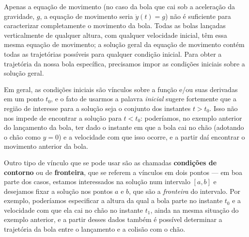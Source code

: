 \documentclass[12pt,a4paper,oneside]{memoir}
\begin{document}
Apenas a equação de movimento (no caso da bola que cai sob a aceleração da gravidade, $g$, a equação de movimento seria $\ddot{y}(t) = g$) não é suficiente para caracterizar completamente o movimento da bola.  Todas as bolas lançadas verticalmente de qualquer altura, com qualquer velocidade inicial, têm essa mesma equação de movimento; a solução geral da equação de movimento contém todas as trajetórias possíveis para qualquer condição inicial.  Para obter a trajetória da nossa bola específica, precisamos impor as condições iniciais sobre a solução geral.

Em geral, as condições iniciais são vínculos sobre a função e/ou suas derivadas em um ponto $t_0$, e o fato de usarmos a palavra \emph{inicial} sugere fortemente que a região de interesse para a solução seja o conjunto dos instantes $t > t_0$.  Isso não nos impede de encontrar a solução para $t < t_0$: poderíamos, no exemplo anterior do lançamento da bola, ter dado o instante em que a bola cai no chão (adotando o chão como $y = 0$) e a velocidade com que isso ocorre, e a partir daí encontrar o movimento anterior da bola.

Outro tipo de vínculo que se pode usar são as chamadas \textbf{condições de contorno} ou de \textbf{fronteira}, que se referem a vínculos em dois pontos --- em boa parte dos casos, estamos interessados na solução num intervalo $[a, b]$ e desejamos fixar a solução nos pontos $a$ e $b$, que são a \emph{fronteira} do intervalo.  Por exemplo, poderíamos especificar a altura da qual a bola parte no instante $t_0$ e a velocidade com que ela cai no chão no instante $t_1$, ainda na mesma situação do exemplo anterior, e a partir desses dados também é possível determinar a trajetória da bola entre o lançamento e a colisão com o chão.
\end{document}
